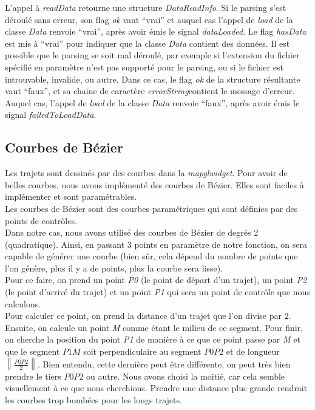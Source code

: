 \documentclass[12pt]{article}
\begin{document}
		L’appel à \textit{readData} retourne une structure \textit{DataReadInfo}. Si le parsing s’est déroulé sans erreur, son flag \textit{ok} vaut “vrai” et auquel cas l’appel de \textit{load} de la classe \textit{Data} renvoie “vrai”, après avoir émis le signal \textit{dataLoaded}. Le flag \textit{hasData} est mis à “vrai” pour indiquer que la classe \textit{Data} contient des données. Il est possible que le parsing se soit mal déroulé, par exemple si l’extension du fichier spécifié en paramètre n’est pas supporté pour le parsing, ou si le fichier est introuvable, invalide, ou autre. Dans ce cas, le flag \textit{ok} de la structure résultante vaut “faux”, et sa chaine de caractère \textit{errorString}contient le message d’erreur. Auquel cas, l’appel de \textit{load} de la classe \textit{Data} renvoie “faux”, après avoir émis le signal \textit{failedToLoadData}.
		
		\newpage
		\subsection{Courbes de Bézier}
		Les trajets sont dessinés par des courbes dans la \textit{mapglwidget}. Pour avoir de belles
		courbes, nous avons implémenté des courbes de Bézier. Elles sont faciles à implémenter et sont
		paramétrables.\\
		
		Les courbes de Bézier sont des courbes paramétriques qui sont définies par
		des points de contrôles.\\
		Dans notre cas, nous avons utilisé des courbes de Bézier de degrés 2 (quadratique). Ainsi,
		en passant 3 points en paramètre de notre fonction, on sera capable de générer une
		courbe (bien sûr, cela dépend du nombre de points que l'on génère, plus il y a de points,
		plus la courbe sera lisse).\\
		Pour ce faire, on prend un point \textit{P0} (le point de départ d'un trajet), un
		point \textit{P2} (le point d'arrivé du trajet) et un point \textit{P1} qui sera
		un point de contrôle que nous calculons.\\
		Pour calculer ce point, on prend la distance d'un trajet que l'on divise par 2. Ensuite,
		on calcule un point \textit{M} comme étant le milieu de ce segment. Pour finir, on cherche la
		position du point \textit{P1} de manière à ce que ce point passe par \textit{M} et que le
		segment $\overline{P1 M}$ soit perpendiculaire au segment $\overline{P0 P2}$ et
		de longueur $\left\lVert \frac{\overline{P0 P2}}{2}\right\rVert$. Bien entendu, cette
		dernière peut être différente, on peut très bien prendre le tiers $\overline{P0 P2}$ ou autre.
		Nous avons choisi la moitié, car cela semble visuellement à ce que nous cherchions. Prendre
		une distance plus grande rendrait les courbes trop bombées pour les longs trajets. \\
		
\end{document}
